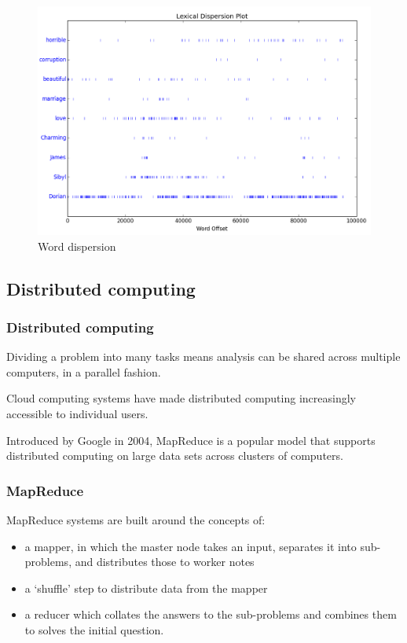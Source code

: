 \begin{figure}[htbp]
\centering
\includegraphics{96Cloud/figures/dorian_dispersion.png}
\caption{Word dispersion}
\end{figure}

\subsection{Distributed computing}\label{distributed-computing}

\subsubsection{Distributed computing}\label{distributed-computing-1}

Dividing a problem into many tasks means analysis can be shared across
multiple computers, in a parallel fashion.

Cloud computing systems have made distributed computing increasingly
accessible to individual users.

Introduced by Google in 2004, MapReduce is a popular model that supports
distributed computing on large data sets across clusters of computers.

\subsubsection{MapReduce}\label{mapreduce}

MapReduce systems are built around the concepts of:

\begin{itemize}
\itemsep1pt\parskip0pt
\item
  a mapper, in which the master node takes an input, separates it into
  sub-problems, and distributes those to worker notes
\item
  a `shuffle' step to distribute data from the mapper
\item
  a reducer which collates the answers to the sub-problems and combines
  them to solves the initial question.
\end{itemize}

